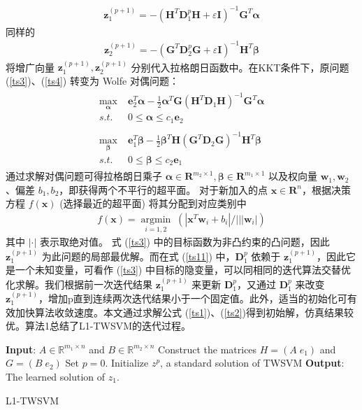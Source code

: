 \begin{align}
	\mathbf{z}_1^{(p+1)}=-(\mathbf{H}^T\mathbf{D}_1^p\mathbf{H}+\varepsilon \mathbf{I})^{-1}\mathbf{G}^T\pmb{\alpha}
\end{align}
同样的
\begin{align}
	\mathbf{z}_2^{(p+1)}=-(\mathbf{G}^T\mathbf{D}_2^p\mathbf{G}+\varepsilon \mathbf{I})^{-1}\mathbf{H}^T\pmb{\beta}
\end{align}
将增广向量 $\mathbf{z}_1^{(p+1)},\mathbf{z}_2^{(p+1)}$ 分别代入拉格朗日函数中。在KKT条件下，原问题 (\ref{ts3})、(\ref{ts4}) 转变为 Wolfe 对偶问题：
\begin{align}
\begin{split}
	\max \limits_{\pmb{\alpha}} \;& \mathbf{e}_2^T\pmb{\alpha}-\frac{1}{2}\pmb{\alpha}^T\mathbf{G}(\mathbf{H}^T\mathbf{D}_1\mathbf{H})^{-1}\mathbf{G}^T\pmb{\alpha} \\
	s.t.\;& 0\le \pmb{\alpha} \le c_1\mathbf{e}_2
\end{split}
\\
\begin{split}		
	\max \limits_{\pmb{\beta}} \;& \mathbf{e}_1^T\pmb{\beta}-\frac{1}{2}\pmb{\beta}^T\mathbf{H}(\mathbf{G}^T\mathbf{D}_2\mathbf{G})^{-1}\mathbf{H}^T\pmb{\beta} \\
	s.t.\;& 0\le \pmb{\beta} \le c_2\mathbf{e}_1
\end{split}
\end{align}
通过求解对偶问题可得拉格朗日乘子 $\pmb{\alpha} \in \pmb{R}^{m_2\times 1},\pmb{\beta} \in \pmb{R}^{m_1\times 1}$ 以及权向量 $\mathbf{w}_1,\mathbf{w}_2$、偏差 $b_1,b_2$，即获得两个不平行的超平面。
对于新加入的点 $\mathbf{x}\in \mathbf{R}^n$，根据决策方程 $f(\mathbf{x})$ (选择最近的超平面) 将其分配到对应类别中
\begin{align}
	f(\mathbf{x})=\mathop{\arg\min}\limits_{i=1,2} \;(|\mathbf{x}^T\mathbf{w}_i+b_i|/|||\mathbf{w}_i|)
\end{align}
其中 $|\cdot|$ 表示取绝对值。
式 (\ref{ts3}) 中的目标函数为非凸约束的凸问题，因此 $\mathbf{z}_1^{(p+1)}$ 为此问题的局部最优解。而在式 (\ref{ts11}) 中，$\mathbf{D}_1^p$ 依赖于 $\mathbf{z}_1^{(p+1)}$，因此它是一个未知变量，可看作 (\ref{ts3}) 中目标的隐变量，可以同相同的迭代算法交替优化求解。我们根据前一次迭代结果 $\mathbf{z}_1^{(p+1)}$ 来更新 $\mathbf{D}_1^p$，又通过 $\mathbf{D}_1^p$ 来改变 $\mathbf{z}_1^{(p+1)}$，增加p直到连续两次迭代结果小于一个固定值。此外，适当的初始化可有效加快算法收敛速度。本文通过求解公式 (\ref{ts1})、(\ref{ts2})得到初始解，仿真结果较优。算法1总结了L1-TWSVM的迭代过程。

\begin{algorithm}[H]
 \textbf{Input}: $A \in \mathbb{R}^{m_1 \times n}$ and $B \in \mathbb{R}^{m_2 \times n}$\;
 Construct the matrices $H = (A\; e_1)$ and $G = (B\; e_2)$\;
 Set $p = 0$. Initialize $z^p$, a standard solution of TWSVM\;
 \textbf{Output}: The learned solution of $z_1$.
 \caption{L1-TWSVM}
\end{algorithm}